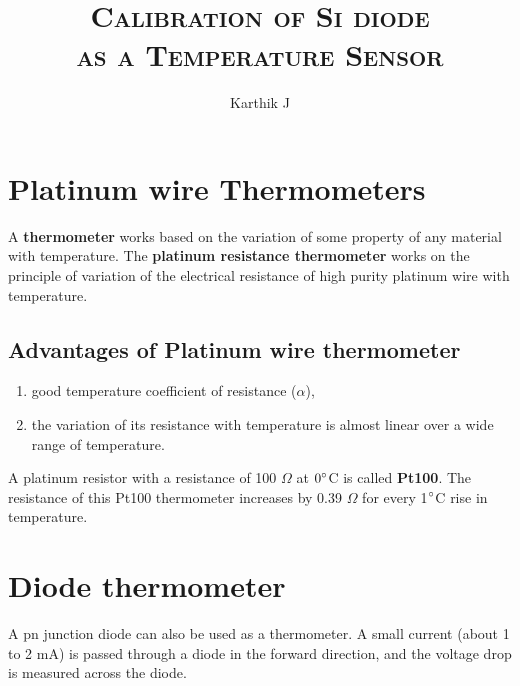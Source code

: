 \documentclass[11pt,a4paper]{article}
\author{Karthik J}
\date{}
\title{\vspace{-50pt}\textsc{Calibration of Si diode\\as a Temperature Sensor}}
\begin{document}
	\maketitle
	\section{Platinum wire Thermometers}
	A \textbf{thermometer} works based on the variation of some property of any material with temperature. The \textbf{platinum resistance thermometer} works on the principle of variation of the electrical resistance of high purity platinum wire with temperature. 
	\subsection{Advantages of Platinum wire thermometer}
	\begin{enumerate}
		\item 	good temperature coefficient of
		resistance ($\alpha$),
		\item 	the variation of its resistance with temperature is almost linear over a wide range of temperature.
	\end{enumerate}
	A platinum resistor with a resistance of 100 $\Omega$ at $0\degree$C is called \textbf{Pt100}. The resistance of this Pt100 thermometer increases by 0.39 $\Omega$ for every 1$\degree$C rise in temperature.
	
	\section{Diode thermometer}
	
	A pn junction diode can also be used as a thermometer. A small current (about 1 to 2 mA) is passed through a diode in the forward direction, and the voltage drop is measured across the diode. 
	
\end{document}
